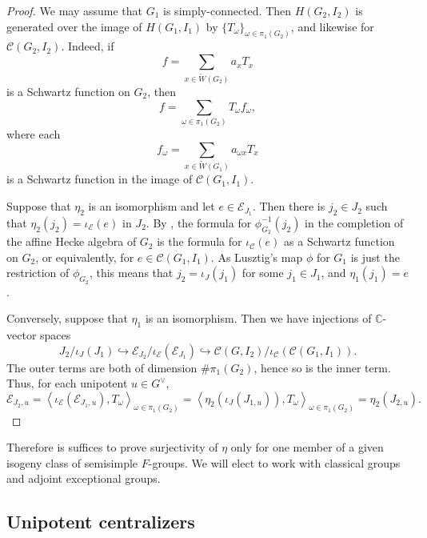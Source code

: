 \documentclass[10pt]{article}
\def\into{\mathrel{\hookrightarrow}}
\newcommand{\bangles}[1]{\left\langle #1 \right\rangle}
\newcommand{\Ee}{\mathcal{E}}
\newcommand{\C}{\mathbb{C}}
\theoremstyle{definition}
\theoremstyle{remark}
\newcommand{\Gd}{G^\vee}
\begin{document}
\begin{proof}
We may assume that $G_1$ is simply-connected. Then $H(G_2,I_2)$ is generated over the image of $H(G_1,I_1)$
by $\{T_{\omega}\}_{\omega\in\pi_1(G_2)}$, and likewise for $\mathcal{C}(G_2,I_2)$. Indeed,
if 
%
\[
f=\sum_{x\in\widetilde{W}(G_2)}a_xT_x
\]
%
is a Schwartz function on $G_2$, then 
%
\[
f=\sum_{\omega\in\pi_1(G_2)}T_\omega f_\omega,
\]
%
where each 
%
\[
f_\omega=\sum_{x\in\widetilde{W}(G_1)}a_{\omega x}T_x
\]
%
is a Schwartz function in the image of $\mathcal{C}(G_1,I_1)$.

Suppose that $\eta_2$ is an isomorphism and let $e\in \Ee_{J_1}$. Then there is $j_2\in J_2$ such that
$\eta_2(j_2)=\iota_\Ee(e)$ in $J_2$. By \cite{Plancherel}, the formula for $\phi_{G_2}^{-1}(j_2)$ in the 
completion of the affine Hecke algebra of $G_2$ is the formula for $\iota_\mathcal{C}(e)$ as a Schwartz function on $G_2$, or equivalently, for $e\in\mathcal{C}(G_1,I_1)$. As Lusztig's map $\phi$ for $G_1$ is just the restriction of $\phi_{G_2}$, this means that $j_2=\iota_J(j_1)$ for some $j_1\in J_1$, and $\eta_1(j_1)=e$.

Conversely, suppose that $\eta_1$ is an isomorphism. Then we have injections of $\C$-vector spaces
%
\[
J_2/\iota_J(J_1)\into\mathcal{E}_{J_2}/\iota_\Ee(\mathcal{E}_{J_1})\into\mathcal{C}(G,I_2)/\iota_\mathcal{C}(\mathcal{C}(G_1,I_1)).
\]
%
The outer terms are both of dimension $\#\pi_1(G_2)$, hence so is the inner term. Thus, for each
unipotent $u\in\Gd$,
%
\[
\mathcal{E}_{J_2,u}=\bangles{\iota_{\Ee}(\Ee_{J_1,u}), T_{\omega}}_{\omega\in\pi_1(G_2)}=
\bangles{\eta_2(\iota_J(J_{1,u})),T_{\omega}}_{\omega\in\pi_1(G_2)}=\eta_2(J_{2,u}).
\]
%
\end{proof}
%
Therefore is suffices to prove surjectivity of $\eta$ only for one member of a given isogeny class
of semisimple $F$-groups. We will elect to work with classical groups and adjoint exceptional groups.
%

%
\subsection{Unipotent centralizers}
\label{subsection Unipotent centralizers}
%
\end{document}
